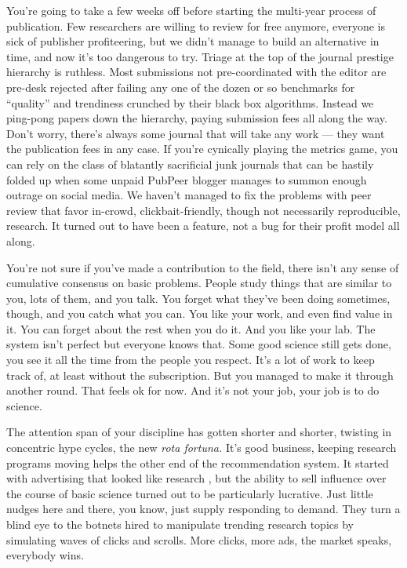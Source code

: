 \documentclass[10pt]{article}
\begin{document}
\begin{multicols}{2}
You're going to take a few weeks off before starting the multi-year
process of publication. Few researchers are willing to review for free
anymore, everyone is sick of publisher profiteering, but we didn't
manage to build an alternative in time, and now it's too dangerous to
try. Triage at the top of the journal prestige hierarchy is ruthless.
Most submissions not pre-coordinated with the editor are pre-desk
rejected after failing any one of the dozen or so benchmarks for
``quality'' and trendiness crunched by their black box algorithms.
Instead we ping-pong papers down the hierarchy, paying submission fees
all along the way. Don't worry, there's always some journal that will
take any work --- they want the publication fees in any case. If you're
cynically playing the metrics game, you can rely on the class of
blatantly sacrificial junk journals that can be hastily folded up when
some unpaid PubPeer blogger manages to summon enough outrage on social
media. We haven't managed to fix the problems with peer review that
favor in-crowd, clickbait-friendly, though not necessarily reproducible,
research. It turned out to have been a feature, not a bug for their
profit model all along.

You're not sure if you've made a contribution to the field, there isn't
any sense of cumulative consensus on basic problems. People study things
that are similar to you, lots of them, and you talk. You forget what
they've been doing sometimes, though, and you catch what you can. You
like your work, and even find value in it. You can forget about the rest
when you do it. And you like your lab. The system isn't perfect but
everyone knows that. Some good science still gets done, you see it all
the time from the people you respect. It's a lot of work to keep track
of, at least without the subscription. But you managed to make it
through another round. That feels ok for now. And it's not your job,
your job is to do science.

The attention span of your discipline has gotten shorter and shorter,
twisting in concentric hype cycles, the new \emph{rota fortuna.} It's
good business, keeping research programs moving helps the other end of
the recommendation system. It started with advertising that looked like
research \cite{elsevier360AdvertisingSolutions} , but the ability
to sell influence over the course of basic science turned out to be
particularly lucrative. Just little nudges here and there, you know,
just supply responding to demand. They turn a blind eye to the botnets
hired to manipulate trending research topics by simulating waves of
clicks and scrolls. More clicks, more ads, the market speaks, everybody
wins.


\end{multicols}
\end{document}

